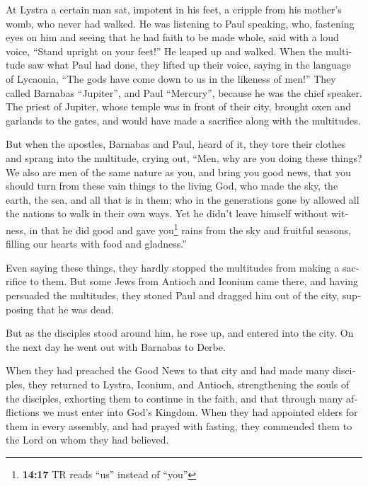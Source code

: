 \begin{paracol}{2}
\begin{otherlanguage}{english}
 At Lystra a certain man sat, impotent in his feet, a
cripple from his mother's womb, who never had walked.  He
was listening to Paul speaking, who, fastening eyes on him and seeing
that he had faith to be made whole,  said with a loud
voice, ``Stand upright on your feet!'' He leaped up and walked.
 When the multitude saw what Paul had done, they lifted
up their voice, saying in the language of Lycaonia, ``The gods have come
down to us in the likeness of men!''  They called
Barnabas ``Jupiter'', and Paul ``Mercury'', because he was the chief
speaker.  The priest of Jupiter, whose temple was in
front of their city, brought oxen and garlands to the gates, and would
have made a sacrifice along with the multitudes.

 But when the apostles, Barnabas and Paul, heard of it,
they tore their clothes and sprang into the multitude, crying out,
 ``Men, why are you doing these things? We also are men
of the same nature as you, and bring you good news, that you should turn
from these vain things to the living God, who made the sky, the earth,
the sea, and all that is in them;  who in the generations
gone by allowed all the nations to walk in their own ways.
 Yet he didn't leave himself without witness, in that he
did good and gave you\footnote{\textbf{14:17} TR reads ``us'' instead of
  ``you''} rains from the sky and fruitful seasons, filling our hearts
with food and gladness.''

 Even saying these things, they hardly stopped the
multitudes from making a sacrifice to them.  But some
Jews from Antioch and Iconium came there, and having persuaded the
multitudes, they stoned Paul and dragged him out of the city, supposing
that he was dead.

 But as the disciples stood around him, he rose up, and
entered into the city. On the next day he went out with Barnabas to
Derbe.

 When they had preached the Good News to that city and
had made many disciples, they returned to Lystra, Iconium, and Antioch,
 strengthening the souls of the disciples, exhorting them
to continue in the faith, and that through many afflictions we must
enter into God's Kingdom.  When they had appointed elders
for them in every assembly, and had prayed with fasting, they commended
them to the Lord on whom they had believed.


\end{otherlanguage}
\end{paracol}
